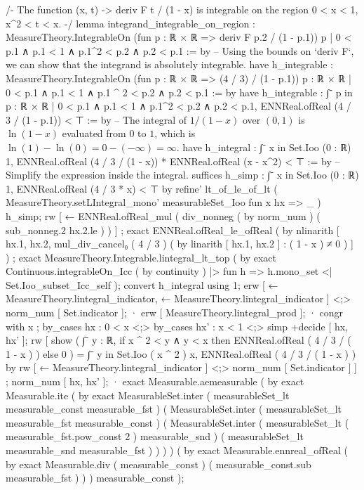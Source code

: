 /-
The function (x, t) -> deriv F t / (1 - x) is integrable on the region 0 < x < 1, x^2 < t < x.
-/
lemma integrand_integrable_on_region :
  MeasureTheory.IntegrableOn (fun p : ℝ × ℝ => deriv F p.2 / (1 - p.1)) {p | 0 < p.1 ∧ p.1 < 1 ∧ p.1^2 < p.2 ∧ p.2 < p.1} := by
    -- Using the bounds on `deriv F`, we can show that the integrand is absolutely integrable.
    have h_integrable : MeasureTheory.IntegrableOn (fun p : ℝ × ℝ => (4 / 3) / (1 - p.1)) {p : ℝ × ℝ | 0 < p.1 ∧ p.1 < 1 ∧ p.1 ^ 2 < p.2 ∧ p.2 < p.1} := by
      have h_integrable : ∫⁻ p in {p : ℝ × ℝ | 0 < p.1 ∧ p.1 < 1 ∧ p.1^2 < p.2 ∧ p.2 < p.1}, ENNReal.ofReal (4 / 3 / (1 - p.1)) < ⊤ := by
        -- The integral of $1/(1-x)$ over $(0,1)$ is $\ln(1-x)$ evaluated from $0$ to $1$, which is $\ln(1) - \ln(0) = 0 - (-\infty) = \infty$.
        have h_integral : ∫⁻ x in Set.Ioo (0 : ℝ) 1, ENNReal.ofReal (4 / 3 / (1 - x)) * ENNReal.ofReal (x - x^2) < ⊤ := by
          -- Simplify the expression inside the integral.
          suffices h_simp : ∫⁻ x in Set.Ioo (0 : ℝ) 1, ENNReal.ofReal (4 / 3 * x) < ⊤ by
            refine' lt_of_le_of_lt ( MeasureTheory.setLIntegral_mono' measurableSet_Ioo fun x hx => _ ) h_simp;
            rw [ ← ENNReal.ofReal_mul ( div_nonneg ( by norm_num ) ( sub_nonneg.2 hx.2.le ) ) ] ; exact ENNReal.ofReal_le_ofReal ( by nlinarith [ hx.1, hx.2, mul_div_cancel₀ ( 4 / 3 ) ( by linarith [ hx.1, hx.2 ] : ( 1 - x ) ≠ 0 ) ] ) ;
          exact MeasureTheory.Integrable.lintegral_lt_top ( by exact Continuous.integrableOn_Icc ( by continuity ) |> fun h => h.mono_set <| Set.Ioo_subset_Icc_self );
        convert h_integral using 1;
        erw [ ← MeasureTheory.lintegral_indicator, ← MeasureTheory.lintegral_indicator ] <;> norm_num [ Set.indicator ];
        · erw [ MeasureTheory.lintegral_prod ];
          · congr with x ; by_cases hx : 0 < x <;> by_cases hx' : x < 1 <;> simp +decide [ hx, hx' ];
            rw [ show ( ∫⁻ y : ℝ, if x ^ 2 < y ∧ y < x then ENNReal.ofReal ( 4 / 3 / ( 1 - x ) ) else 0 ) = ∫⁻ y in Set.Ioo ( x ^ 2 ) x, ENNReal.ofReal ( 4 / 3 / ( 1 - x ) ) by rw [ ← MeasureTheory.lintegral_indicator ] <;> norm_num [ Set.indicator ] ] ; norm_num [ hx, hx' ];
          · exact Measurable.aemeasurable ( by exact Measurable.ite ( by exact MeasurableSet.inter ( measurableSet_lt measurable_const measurable_fst ) ( MeasurableSet.inter ( measurableSet_lt measurable_fst measurable_const ) ( MeasurableSet.inter ( measurableSet_lt ( measurable_fst.pow_const 2 ) measurable_snd ) ( measurableSet_lt measurable_snd measurable_fst ) ) ) ) ( by exact Measurable.ennreal_ofReal ( by exact Measurable.div ( measurable_const ) ( measurable_const.sub measurable_fst ) ) ) measurable_const );
